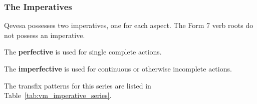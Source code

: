 \documentclass[grammar]{subfiles}
\begin{document}
  \newpage
  \subsubsection{The Imperatives}
  \label{sssec:vm_imperatives}
  
  Qevesa possesses two imperatives, one for each aspect. The Form 7 verb roots do not possess an imperative. 

  \begin{itemize*}
    \item The \textbf{perfective} is used for single complete actions. 
    \item The \textbf{imperfective} is used for continuous or otherwise incomplete actions. 
  \end{itemize*}

  The transfix patterns for this series are listed in Table~\ref{tab:vm_imperative_series}. 
\end{document}
